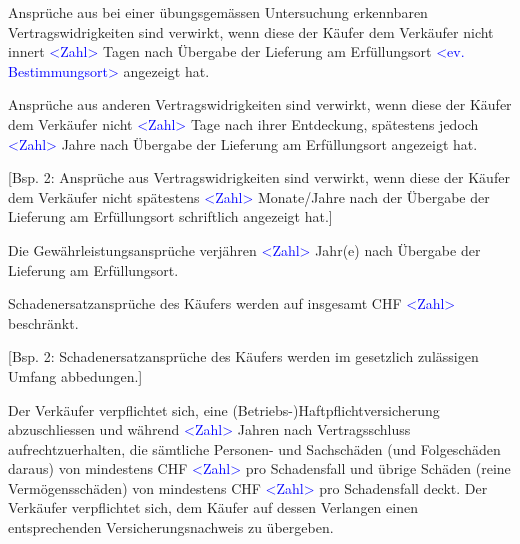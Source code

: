 \documentclass[parskip=half]{scrreprt}
\begin{document}
\begin{contract}

Ansprüche aus bei einer übungsgemässen Untersuchung erkennbaren Vertragswidrigkeiten sind verwirkt, wenn diese der Käufer dem Verkäufer nicht innert \textcolor{blue}{<Zahl>} Tagen nach Übergabe der Lieferung am Erfüllungsort \textcolor{blue}{<ev. Bestimmungsort>} angezeigt hat.

Ansprüche aus anderen Vertragswidrigkeiten sind verwirkt, wenn diese der Käufer dem Verkäufer nicht \textcolor{blue}{<Zahl>} Tage nach ihrer Entdeckung, spätestens jedoch \textcolor{blue}{<Zahl>} Jahre nach Übergabe der Lieferung am Erfüllungsort angezeigt hat.


[Bsp. 2: Ansprüche aus Vertragswidrigkeiten sind verwirkt, wenn diese der Käufer dem Verkäufer nicht spätestens \textcolor{blue}{<Zahl>} Monate/Jahre nach der Übergabe der Lieferung am Erfüllungsort schriftlich angezeigt hat.]
\parnumbertrue


Die Gewährleistungsansprüche verjähren \textcolor{blue}{<Zahl>} Jahr(e) nach Übergabe der Lieferung am Erfüllungsort.

\parnumbertrue




Schadenersatzansprüche des Käufers werden auf insgesamt CHF \textcolor{blue}{<Zahl>} beschränkt.


[Bsp. 2: Schadenersatzansprüche des Käufers werden im gesetzlich zulässigen Umfang abbedungen.]
\parnumbertrue

Der Verkäufer verpflichtet sich, eine (Betriebs-)Haftpflichtversicherung abzuschliessen und während \textcolor{blue}{<Zahl>} Jahren nach Vertragsschluss aufrechtzuerhalten, die sämtliche Personen- und Sachschäden (und Folgeschäden daraus) von mindestens CHF \textcolor{blue}{<Zahl>} pro Schadensfall und übrige Schäden (reine Vermögensschäden) von mindestens CHF \textcolor{blue}{<Zahl>} pro Schadensfall deckt. Der Verkäufer verpflichtet sich, dem Käufer auf dessen Verlangen einen entsprechenden Versicherungsnachweis zu übergeben.




\end{contract}
\end{document}
